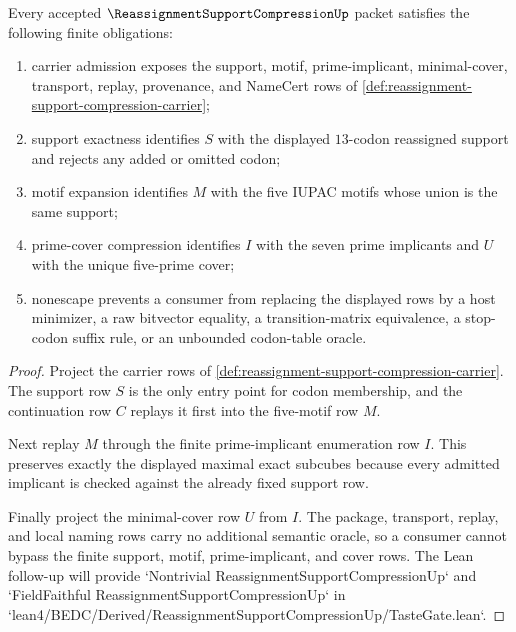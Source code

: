 \begin{theorem}
\label{thm:reassignment-support-compression-namecert-obligations}
Every accepted $\ReassignmentSupportCompressionUp$ packet satisfies the following finite obligations:
\begin{enumerate}
\item carrier admission exposes the support, motif, prime-implicant, minimal-cover, transport, replay, provenance, and NameCert rows of \autoref{def:reassignment-support-compression-carrier};
\item support exactness identifies $S$ with the displayed $13$-codon reassigned support and rejects any added or omitted codon;
\item motif expansion identifies $M$ with the five IUPAC motifs whose union is the same support;
\item prime-cover compression identifies $I$ with the seven prime implicants and $U$ with the unique five-prime cover;
\item nonescape prevents a consumer from replacing the displayed rows by a host minimizer, a raw bitvector equality, a transition-matrix equivalence, a stop-codon suffix rule, or an unbounded codon-table oracle.
\end{enumerate}
\end{theorem}
\begin{proof}
Project the carrier rows of \autoref{def:reassignment-support-compression-carrier}. The support row $S$ is the only entry point for codon membership, and the continuation row $C$ replays it first into the five-motif row $M$.

Next replay $M$ through the finite prime-implicant enumeration row $I$. This preserves exactly the displayed maximal exact subcubes because every admitted implicant is checked against the already fixed support row.

Finally project the minimal-cover row $U$ from $I$. The package, transport, replay, and local naming rows carry no additional semantic oracle, so a consumer cannot bypass the finite support, motif, prime-implicant, and cover rows. The Lean follow-up will provide `Nontrivial ReassignmentSupportCompressionUp` and `FieldFaithful ReassignmentSupportCompressionUp` in `lean4/BEDC/Derived/ReassignmentSupportCompressionUp/TasteGate.lean`.
\end{proof}

